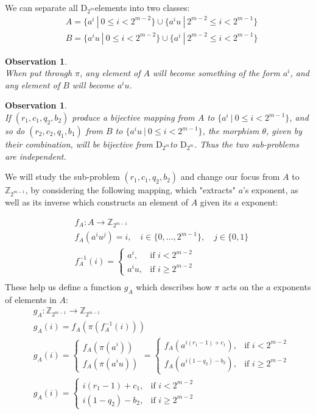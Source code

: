\documentclass[11pt]{llncs}
\newcommand{\dm}[0]{$\text{D}_{2^m}$\hspace{0.7mm}}
\newtheorem{observation}[theorem]{Observation}
\begin{document}
We can separate all \dm elements into two classes: \[ \begin{aligned}
& A = \{a^i\ |\ 0 \leq i < 2^{m-2}\} \cup \{a^iu\ |\ 2^{m-2} \leq i < 2^{m-1}\} \\
& B = \{a^iu\ |\ 0 \leq i < 2^{m-2}\} \cup \{a^i\ |\ 2^{m-2} \leq i < 2^{m-1}\}
\end{aligned} \]

\begin{observation} \label{split-inject} \hfill\\
When put through $\pi$, any element of $A$ will become something of the form $a^i$, and any element of $B$ will become $a^iu$. \end{observation}

\begin{observation} \label{split-indep} \hfill\\
If $(r_1, c_1, q_2, b_2)$ produce a bijective mapping from $A$ to $\{a^i\ |\ 0 \leq i < 2^{m-1}\}$, and so do $(r_2, c_2, q_1, b_1)$ from $B$ to $\{a^iu\ |\ 0 \leq i < 2^{m-1}\}$, the morphism $\theta$, given by their combination, will be bijective from \dm to \dm. Thus the two sub-problems are independent. \end{observation}

We will study the sub-problem $(r_1,c_1,q_2,b_2)$ and change our focus from $A$ to $\mathbb{Z}_{2^{m-1}}$, by considering the following mapping, which "extracts" $a$'s exponent, as well as its inverse which constructs an element of $A$ given its $a$ exponent:

\[ \begin{aligned}
& f_A: A \to \mathbb{Z}_{2^{m-1}} \\
& f_A(a^iu^j) = i,\quad i \in \{0, \dots, 2^{m-1}\},\quad j \in \{0,1\} \\
& f_A^{-1}(i) = \begin{cases}
	a^i, & \text{if } i < 2^{m-2} \\
	a^iu, & \text{if } i \geq 2^{m-2}
\end{cases}\\
\end{aligned} \]
These help us define a function $g_A$ which describes how $\pi$ acts on the $a$ exponents of elements in $A$: 
\[ \begin{aligned}
& g_A: \mathbb{Z}_{2^{m-1}} \to \mathbb{Z}_{2^{m-1}} \\
& g_A(i) = f_A(\pi(f_A^{-1}(i))) \\
& g_A(i) = \begin{cases}
	f_A(\pi(a^i)) \\
	f_A(\pi(a^iu))
\end{cases} = \begin{cases}
	f_A(a^{i(r_1-1)+c_1}), & \text{if } i < 2^{m-2} \\
	f_A(a^{i(1-q_2)-b_2}), & \text{if }  i \geq 2^{m-2}
\end{cases} \\
& g_A(i) = \begin{cases}
	i(r_1-1)+c_1, & \text{if } i < 2^{m-2} \\
	i(1-q_2)-b_2, & \text{if }  i \geq 2^{m-2}
\end{cases}
\end{aligned} \]
\end{document}
